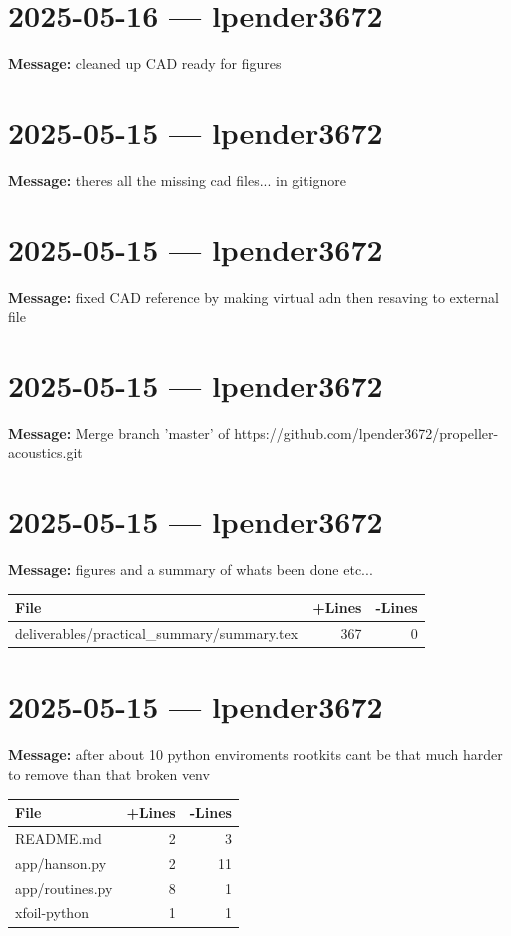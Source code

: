 \documentclass{article}
\begin{document}
\section*{2025-05-16 --- lpender3672}
\textbf{Message:} cleaned up CAD ready for figures

\section*{2025-05-15 --- lpender3672}
\textbf{Message:} theres all the missing cad files... in gitignore

\section*{2025-05-15 --- lpender3672}
\textbf{Message:} fixed CAD reference by making virtual adn then resaving to external file

\section*{2025-05-15 --- lpender3672}
\textbf{Message:} Merge branch 'master' of https://github.com/lpender3672/propeller-acoustics.git

\section*{2025-05-15 --- lpender3672}
\textbf{Message:} figures and a summary of whats been done etc...

\begin{longtable}{|p{10cm}|r|r|}
\hline \textbf{File} & \textbf{+Lines} & \textbf{-Lines} \\
\hline
deliverables/practical\_summary/summary.tex & 367 & 0 \\
\hline
\end{longtable}

\section*{2025-05-15 --- lpender3672}
\textbf{Message:} after about 10 python enviroments rootkits cant be that much harder to remove than that broken venv

\begin{longtable}{|p{10cm}|r|r|}
\hline \textbf{File} & \textbf{+Lines} & \textbf{-Lines} \\
\hline
README.md & 2 & 3 \\
\hline
app/hanson.py & 2 & 11 \\
\hline
app/routines.py & 8 & 1 \\
\hline
xfoil-python & 1 & 1 \\
\hline
\end{longtable}
\end{document}
